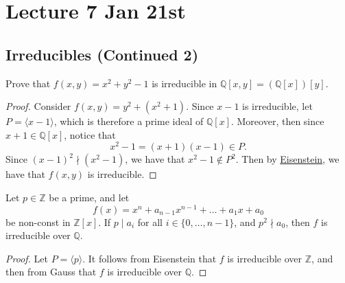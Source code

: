 \documentclass[notoc,notitlepage,nobib]{tufte-book}
\begin{document}


\chapter{Lecture 7 Jan 21st}%
\label{chp:lecture_7_jan_21st}

\section{Irreducibles (Continued 2)}%
\label{sec:irreducibles_continued_2}

\begin{eg}
  Prove that $f(x, y) = x^2 + y^2 - 1$ is irreducible in $\mathbb{Q}[x, y] = (\mathbb{Q}[x])[y]$.
\end{eg}

\begin{proof}
  Consider $f(x, y) = y^2 + (x^2 + 1)$. Since $x - 1$ is irreducible, let $P =
  \langle x - 1 \rangle$, which is therefore a prime ideal of $\mathbb{Q}[x]$.
  Moreover, then since $x + 1 \in \mathbb{Q}[x]$, notice that
  \begin{equation*}
    x^2 - 1 = ( x + 1 )( x - 1 ) \in P.
  \end{equation*}
  Since $(x - 1)^2 \nmid \left(x^2 - 1\right)$,  we have that $x^2 - 1 \notin
  P^2$. Then by \hyperref[propo:eisenstein_s_criterion]{Eisenstein}, we have
  that $f(x, y)$ is irreducible.
\end{proof}

\begin{crly}\label{crly:eisenstein_gauss}
  Let $p \in \mathbb{Z}$ be a prime, and let
  \begin{equation*}
    f(x) = x^n + a_{n - 1} x^{n - 1} + \hdots + a_1 x + a_0
  \end{equation*}
  be non-const in $\mathbb{Z}[x]$. If $p \mid a_i$ for all $i \in \{0, \ldots, n - 1\}$, and
  $p^2 \nmid a_0$, then $f$ is irreducible over $\mathbb{Q}$.
\end{crly}


\begin{proof}
  Let $P = \langle p \rangle$. It follows from Eisenstein that $f$ is irreducible over $\mathbb{Z}$,
  and then from Gauss that $f$ is irreducible over $\mathbb{Q}$.
\end{proof}
\end{document}
